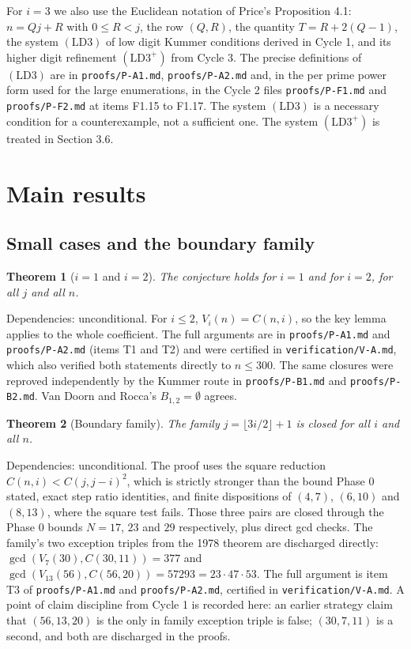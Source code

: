 \documentclass[11pt]{article}
\newtheorem{theorem}{Theorem}[section]
\theoremstyle{remark}
\newcommand{\LDthree}{\ensuremath{\mathrm{(LD3)}}}
\newcommand{\LDthreeplus}{\ensuremath{\mathrm{(LD3^+)}}}
\begin{document}
For $i=3$ we also use the Euclidean notation of Price's Proposition 4.1: $n=Qj+R$ with $0\le R<j$, the row $(Q,R)$, the quantity $T=R+2(Q-1)$, the system \LDthree{} of low digit Kummer conditions derived in Cycle 1, and its higher digit refinement \LDthreeplus{} from Cycle 3. The precise definitions of \LDthree{} are in \texttt{proofs/P-A1.md}, \texttt{proofs/P-A2.md} and, in the per prime power form used for the large enumerations, in the Cycle 2 files \texttt{proofs/P-F1.md} and \texttt{proofs/P-F2.md} at items F1.15 to F1.17. The system \LDthree{} is a necessary condition for a counterexample, not a sufficient one. The system \LDthreeplus{} is treated in Section 3.6.

\section{Main results}

\subsection{Small cases and the boundary family}

\begin{theorem}[$i=1$ and $i=2$]
\label{thm:small}
The conjecture holds for $i=1$ and for $i=2$, for all $j$ and all $n$.
\end{theorem}

Dependencies: unconditional. For $i\le 2$, $V_i(n)=C(n,i)$, so the key lemma applies to the whole coefficient. The full arguments are in \texttt{proofs/P-A1.md} and \texttt{proofs/P-A2.md} (items T1 and T2) and were certified in \texttt{verification/V-A.md}, which also verified both statements directly to $n\le 300$. The same closures were reproved independently by the Kummer route in \texttt{proofs/P-B1.md} and \texttt{proofs/P-B2.md}. Van Doorn and Rocca's $B_{1,2}=\emptyset$ agrees.

\begin{theorem}[Boundary family]
\label{thm:boundary}
The family $j=\lfloor 3i/2\rfloor+1$ is closed for all $i$ and all $n$.
\end{theorem}

Dependencies: unconditional. The proof uses the square reduction $C(n,i)<C(j,j-i)^2$, which is strictly stronger than the bound Phase 0 stated, exact step ratio identities, and finite dispositions of $(4,7)$, $(6,10)$ and $(8,13)$, where the square test fails. Those three pairs are closed through the Phase 0 bounds $N=17$, $23$ and $29$ respectively, plus direct gcd checks. The family's two exception triples from the 1978 theorem are discharged directly: $\gcd(V_7(30),C(30,11))=377$ and $\gcd(V_{13}(56),C(56,20))=57293=23\cdot 47\cdot 53$. The full argument is item T3 of \texttt{proofs/P-A1.md} and \texttt{proofs/P-A2.md}, certified in \texttt{verification/V-A.md}. A point of claim discipline from Cycle 1 is recorded here: an earlier strategy claim that $(56,13,20)$ is the only in family exception triple is false; $(30,7,11)$ is a second, and both are discharged in the proofs.
\end{document}
